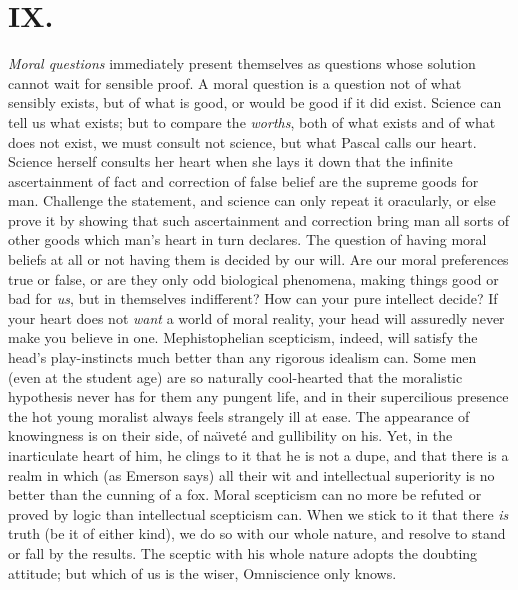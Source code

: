 \documentclass[12pt]{article}
\begin{document}
\section*{IX.}

\emph{Moral questions} immediately present themselves as questions whose solution cannot wait for sensible proof.  A moral question is a question not of what sensibly exists, but of what is good, or would be good if it did exist.  Science can tell us what exists; but to compare the \emph{worths}, both of what exists and of what does not exist, we must consult not science, but what Pascal calls our heart.  Science herself consults her heart when she lays it down that the infinite ascertainment of fact and correction of false belief are the supreme goods for man.  Challenge the statement, and science can only repeat it oracularly, or else prove it by showing that such ascertainment and correction bring man all sorts of other goods which man's heart in turn declares.  The question of having moral beliefs at all or not having them is decided by  our will.  Are our moral preferences true or false, or are they only odd biological phenomena, making things good or bad for \emph{us}, but in themselves indifferent?  How can your pure intellect decide?  If your heart does not \emph{want} a world of moral reality, your head will assuredly never make you believe in one. Mephistophelian scepticism, indeed, will satisfy the head's play-instincts much better than any rigorous idealism can.  Some men (even at the student age) are so naturally cool-hearted that the moralistic hypothesis never has for them any pungent life, and in their supercilious presence the hot young moralist always feels strangely ill at ease.  The appearance of knowingness is on their side, of na\"{\i}vet\'{e} and gullibility on his.  Yet, in the inarticulate heart of him, he clings to it that he is not a dupe, and that there is a realm in which (as Emerson says) all their wit and intellectual superiority is no better than the cunning of a fox.  Moral scepticism can no more be refuted or proved by logic than intellectual scepticism can.  When we stick to it that there \emph{is} truth (be it of either kind), we do so with our whole nature, and resolve to stand or fall by the results.  The sceptic with his whole nature adopts the doubting attitude; but which of us is the wiser, Omniscience only knows.
\end{document}

